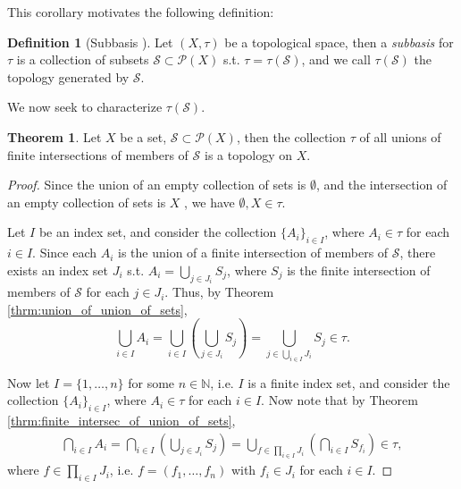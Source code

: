 \documentclass[12pt, a4paper]{article}
\numberwithin{equation}{section}
\theoremstyle{definition}
\theoremstyle{definition}
\newtheorem{defn}[thm]{Definition} %
\newtheorem{theorem}[thm]{Theorem}
\begin{document}
		This corollary motivates the following definition:
		
		\begin{defn}[Subbasis \cite{topology-singh}]
			Let $(X, \tau)$ be a topological space, then a \textit{subbasis} for $\tau$ is a collection of subsets $\mathscr S\subset \mathscr P(X)$ s.t. $\tau = \tau(\mathscr S)$, and we call $\tau(\mathscr S)$ the topology generated by $\mathscr S$.
		\end{defn}
		
		We now seek to characterize $\tau(\mathscr S)$. 
		
		\begin{theorem}\label{thrm:top_gen_by_subbasis_charac}
			Let $X$ be a set, $\mathscr S\subset \mathscr P(X)$, then the collection $\tau$ of all unions of finite intersections of members of $\mathscr S$ is a topology on $X$.
		\end{theorem}
	
		\begin{proof}
			Since the union of an empty collection of sets is $\emptyset$, and the intersection of an empty collection of sets is $X$ \cite{370201}, we have $\emptyset, X\in\tau$. 
			
			Let $I$ be an index set, and consider the collection $\{ A_i \}_{i\in I}$, where $A_i\in\tau$ for each $i\in I$. Since each $A_i$ is the union of a finite intersection of members of $\mathscr S$, there exists an index set $J_i$ s.t. $A_i = \bigcup_{j\in J_i}S_{j}$, where $S_j$ is the finite intersection of members of $\mathscr S$ for each $j\in J_i$. Thus, by Theorem \ref{thrm:union_of_union_of_sets}, 
			$$\bigcup_{i\in I}A_i = \bigcup_{i\in I}\left(\bigcup_{j\in J_i}{S_j}\right) = \bigcup_{j\in \bigcup_{i\in I}J_i}S_j\in \tau.$$
			
			Now let $I = \{1, \dots, n\}$ for some $n\in\mathbb N$, i.e. $I$ is a finite index set, and consider the collection $\{A_i\}_{i\in I}$, where $A_i\in\tau$ for each $i\in I$. Now note that by Theorem \ref{thrm:finite_intersec_of_union_of_sets},
			\begin{align}\label{eq:finite_intersec_arbitrary_unions}
				\bigcap_{i\in I}A_i = \bigcap_{i\in I}\left(\bigcup_{j\in J_i}S_j\right) = \bigcup_{f\in \prod_{i\in I} J_i}\left(\bigcap_{i\in I}S_{f_i}\right)\in\tau,
			\end{align}
			where $f\in\prod_{i\in I}J_i$, i.e. $f = (f_1, \dots, f_n)$ with $f_i\in J_i$ for each $i\in I$.
		\end{proof}
		
\end{document}
